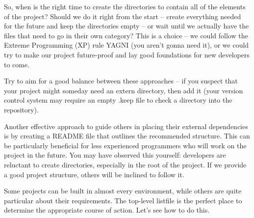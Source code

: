 So, when is the right time to create the directories to contain all of the elements of the project? Should we do it right from the start – create everything needed for the future and keep the directories empty – or wait until we actually have the files that need to go in their own category? This is a choice – we could follow the Extreme Programming (XP) rule YAGNI (you aren’t gonna need it), or we could try to make our project future-proof and lay good foundations for new developers to come.

Try to aim for a good balance between these approaches – if you suspect that your project might someday need an extern directory, then add it (your version control system may require an empty .keep file to check a directory into the repository).

Another effective approach to guide others in placing their external dependencies is by creating a README file that outlines the recommended structure. This can be particularly beneficial for less experienced programmers who will work on the project in the future. You may have observed this yourself: developers are reluctant to create directories, especially in the root of the project. If we provide a good project structure, others will be inclined to follow it.

Some projects can be built in almost every environment, while others are quite particular about their requirements. The top-level listfile is the perfect place to determine the appropriate course of action. Let’s see how to do this.





